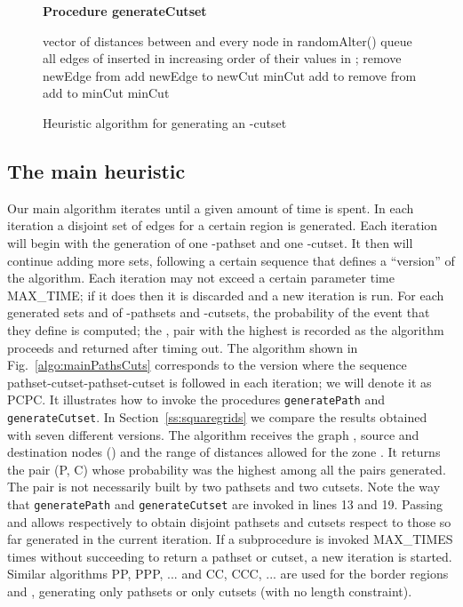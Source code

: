 \documentclass[a4paper]{article}
\begin{document}
\begin{figure}
\textbf{Procedure generateCutset}
\begin{center}
\begin{algorithmic}[1]
\STATE  vector of distances between  and every node in 
\STATE randomAlter()
\STATE queue  all edges of  inserted in increasing order of their values in 
\STATE ; 
	\STATE 
	\IF {}
		\STATE 
		\RETURN 
	\ELSE
		\STATE 
		\STATE remove newEdge from 
		\STATE add newEdge to newCut
	\ENDIF
\ENDWHILE
\STATE minCut 
	\STATE add  to 
	\STATE 
	\IF {}
		\STATE remove  from 
		\STATE add  to minCut
	\ENDIF
\ENDFOR
\RETURN minCut
\end{algorithmic}
\end{center}
\caption{Heuristic algorithm for generating an -cutset}
\label{algo:generateCutset}
\end{figure}

\subsection{The main heuristic}

Our main algorithm iterates until a given amount of time is spent. In each iteration a disjoint set of edges for a certain region  is generated. Each iteration will begin with the generation of one -pathset and one -cutset. It then will continue adding more sets, following a certain sequence that defines a ``version'' of the algorithm. Each iteration may not exceed a certain parameter time MAX\_TIME; if it does then it is discarded and a new iteration is run. For each generated sets  and  of -pathsets and -cutsets, the probability of the event  that they define is computed; the , pair with the highest  is recorded as the algorithm proceeds and returned after timing out. The algorithm shown in Fig.~\ref{algo:mainPathsCuts} corresponds to the version where the sequence pathset-cutset-pathset-cutset is followed in each iteration; we will denote it as PCPC. It illustrates how to invoke the procedures {\tt generatePath} and {\tt generateCutset}. In Section~\ref{ss:squaregrids} we compare the results obtained with seven different versions. The algorithm receives the graph , source and destination nodes () and the range of distances allowed for the zone . It returns the pair (P, C) whose probability was the highest among all the pairs generated. The pair is not necessarily built by two pathsets and two cutsets. Note the way that {\tt generatePath} and {\tt generateCutset} are invoked in lines 13 and 19. Passing  and  allows respectively to obtain disjoint pathsets and cutsets respect to those so far generated in the current iteration. If a subprocedure is invoked MAX\_TIMES times without succeeding to return a pathset or cutset, a new iteration is started. Similar algorithms PP, PPP, ... and CC, CCC, ... are used for the border regions  and , generating only pathsets or only cutsets (with no length constraint).
\end{document}
